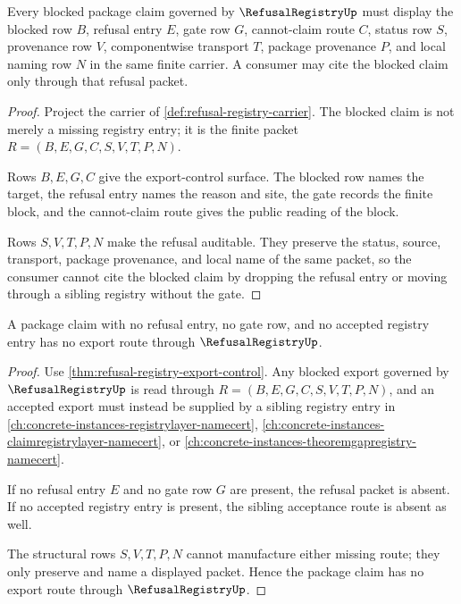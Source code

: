 \begin{theorem}
\label{thm:refusal-registry-export-control}
Every blocked package claim governed by $\RefusalRegistryUp$ must display the blocked row $B$, refusal entry $E$, gate row $G$, cannot-claim route $C$, status row $S$, provenance row $V$, componentwise transport $T$, package provenance $P$, and local naming row $N$ in the same finite carrier. A consumer may cite the blocked claim only through that refusal packet.
\end{theorem}
\begin{proof}
Project the carrier of \autoref{def:refusal-registry-carrier}. The blocked claim is not merely a missing registry entry; it is the finite packet $R=(B,E,G,C,S,V,T,P,N)$.

Rows $B,E,G,C$ give the export-control surface. The blocked row names the target, the refusal entry names the reason and site, the gate records the finite block, and the cannot-claim route gives the public reading of the block.

Rows $S,V,T,P,N$ make the refusal auditable. They preserve the status, source, transport, package provenance, and local name of the same packet, so the consumer cannot cite the blocked claim by dropping the refusal entry or moving through a sibling registry without the gate.
\end{proof}

\begin{theorem}
\label{thm:refusal-registry-nonescape}
A package claim with no refusal entry, no gate row, and no accepted registry entry has no export route through $\RefusalRegistryUp$.
\end{theorem}
\begin{proof}
Use \autoref{thm:refusal-registry-export-control}. Any blocked export governed by $\RefusalRegistryUp$ is read through $R=(B,E,G,C,S,V,T,P,N)$, and an accepted export must instead be supplied by a sibling registry entry in \autoref{ch:concrete-instances-registrylayer-namecert}, \autoref{ch:concrete-instances-claimregistrylayer-namecert}, or \autoref{ch:concrete-instances-theoremgapregistry-namecert}.

If no refusal entry $E$ and no gate row $G$ are present, the refusal packet is absent. If no accepted registry entry is present, the sibling acceptance route is absent as well.

The structural rows $S,V,T,P,N$ cannot manufacture either missing route; they only preserve and name a displayed packet. Hence the package claim has no export route through $\RefusalRegistryUp$.
\end{proof}


